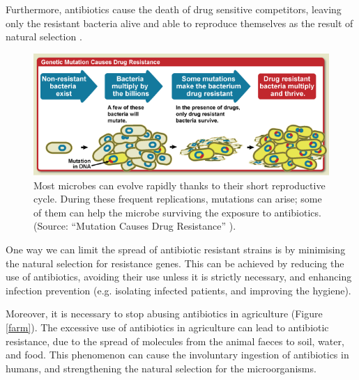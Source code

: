 \documentclass[11pt]{report}
\begin{document}
Furthermore, antibiotics cause the death of drug sensitive competitors, leaving only the resistant bacteria alive and able to reproduce themselves as the result of natural selection \cite{read2014}.

\clearpage
\begin{figure}[htp]
\centering
\includegraphics[scale=0.57]{img/mutation.png}
\caption{Most microbes can evolve rapidly thanks to their short reproductive cycle.
During these frequent replications, mutations can arise; some of them can help the microbe surviving the exposure to antibiotics. (Source: ``Mutation Causes Drug Resistance'' \cite{mutation}).}
\label{mutation}
\end{figure}

One way we can limit the spread of antibiotic resistant strains is by minimising the natural selection for resistance genes.
This can be achieved by reducing the use of antibiotics, avoiding their use unless it is strictly necessary, and enhancing infection prevention (e.g. isolating infected patients, and improving the hygiene).

Moreover, it is necessary to stop abusing antibiotics in agriculture \cite{spellberg2014, read2014} (Figure \ref{farm}).
The excessive use of antibiotics in agriculture can lead to antibiotic resistance, due to the spread of molecules from the animal faeces to soil, water, and food.
This phenomenon can cause the involuntary ingestion of antibiotics in humans, and strengthening the natural selection for the microorganisms.
\end{document}
